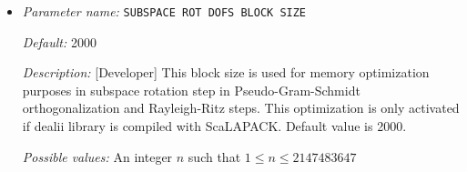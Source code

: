 \begin{itemize}
{\it Possible values:} An integer $n$ such that $0\leq n \leq 300$
\item {\it Parameter name:} {\tt SUBSPACE ROT DOFS BLOCK SIZE}
\label{parameters:SCF parameters/Eigen_2dsolver parameters/SUBSPACE ROT DOFS BLOCK SIZE}
\label{parameters:SCF_20parameters/Eigen_2dsolver_20parameters/SUBSPACE_20ROT_20DOFS_20BLOCK_20SIZE}




{\it Default:} 2000


{\it Description:} [Developer] This block size is used for memory optimization purposes in subspace rotation step in Pseudo-Gram-Schmidt orthogonalization and Rayleigh-Ritz steps. This optimization is only activated if dealii library is compiled with ScaLAPACK. Default value is 2000.


{\it Possible values:} An integer $n$ such that $1\leq n \leq 2147483647$
\end{itemize}
